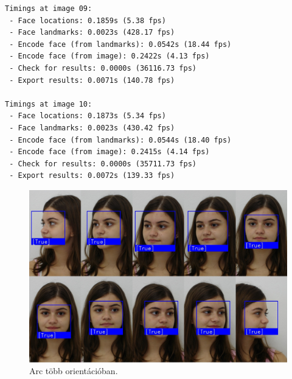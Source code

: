 \begin{lstlisting}[language=tex, caption=Orientáció teszt eredménye.,label=lst:ori_mel]
Timings at image 09:
 - Face locations: 0.1859s (5.38 fps)
 - Face landmarks: 0.0023s (428.17 fps)
 - Encode face (from landmarks): 0.0542s (18.44 fps)
 - Encode face (from image): 0.2422s (4.13 fps)
 - Check for results: 0.0000s (36116.73 fps)
 - Export results: 0.0071s (140.78 fps)

Timings at image 10:
 - Face locations: 0.1873s (5.34 fps)
 - Face landmarks: 0.0023s (430.42 fps)
 - Encode face (from landmarks): 0.0544s (18.40 fps)
 - Encode face (from image): 0.2415s (4.14 fps)
 - Check for results: 0.0000s (35711.73 fps)
 - Export results: 0.0072s (139.33 fps)
\end{lstlisting}

\begin{figure}[!ht]
	\centering
    \includegraphics[width=150mm, keepaspectratio]{03_images/ori_all2.png}
	\caption{Arc több orientációban.}
	\label{fig:ori_test}
\end{figure}